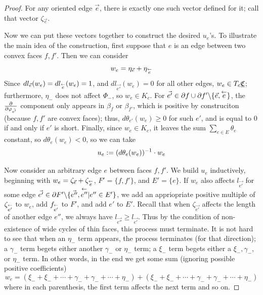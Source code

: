 \begin{proof}
For any oriented edge $\vec{e}$,
there is exactly one such vector defined for it;
call that vector $\zeta_{\vec{e}}$.


Now we can put these vectors together to construct the desired $u_e$'s.
To illustrate the main idea of the construction,
first suppose that $e$ is an edge between two convex faces $f,f'$.
Then we can consider
\[
w_e = \eta_{\vec{e}} + \eta_{\overset{\leftarrow}{e}}
\]
Since $dl_{\vec{e}}(w_e) = dl_{\overset{\leftarrow}{e}}(w_e) = 1$,
and $dl_{\vec{e'}}(w_e) = 0$ for all other edges,
$w_e \in T_c {\underline{\mathfrak{C}}}$;
furthermore, $\eta_-$ does not affect $\Phi_-$,
so $w_e \in K_c$.
For $\vec{e'} \in \partial f \cup \partial f' \backslash \{\vec{e},\overset{\leftarrow}{e}\}$,
the ${\frac{\partial}{\partial \varphi_{\vec{e'}}}}$ component only appears in $\beta_f$
or $\beta_{f'}$, which is positive by construciton
(because $f,f'$ are convex faces);
thus, $d\theta_{e'}(w_e) \geq 0$ for such $e'$, and
is equal to 0 if and only if $e'$ is short.
Finally, since $w_e \in K_c$, it leaves the sum $\sum_{e\in E} \theta_e$
constant, so $d\theta_e(w_e) < 0$, so we can take
\begin{equation}
\label{e:u_e}
u_e := (d\theta_e(w_e))^{-1} \cdot w_e
\end{equation}


Now consider an arbitrary edge $e$ between faces $f,f'$.
We build $u_e$ inductively, beginning with
$w_e = \zeta_{\vec{e}} + \zeta_{\overset{\leftarrow}{e}}$,
$F' = \{f, f'\}$, and $E' = \{e\}$.
If $w_e$ also affects $l_{\vec{e'}}$ for some edge
$\vec{e'} \in \partial F' \backslash\{\vec{e''},\overset{\leftarrow}{e''} | e''\in E'\}$,
we add an appriopriate positive multiple
of $\zeta_{\overset{\leftarrow}{e'}}$ to $w_e$,
add $f_{\overset{\leftarrow}{e'}}$ to $F'$,
and add $e'$ to $E'$.
Recall that when $\zeta_{\vec{e'}}$ affects
the length of another edge $e''$,
we always have $l_{\vec{e''}} \geq l_{\vec{e'}}$.
Thus by the condition of non-existence of wide cycles of thin faces,
this process must terminate.
It is not hard to see that when an $\eta_-$ term appears,
the process terminates (for that direction);
a $\gamma_-$ term begets either another $\gamma_-$ or $\eta_-$ term;
a $\xi_-$ term begets either
a $\xi_-, \gamma_-$, or $\eta_-$ term.
In other words, in the end we get some sum
(ignoring possible positive coefficients)
\[
w_e = (\xi_- + \xi_- + \cdots + \gamma_- + \gamma_- + \cdots + \eta_-)
+ (\xi_- + \xi_- + \cdots + \gamma_- + \gamma_- + \cdots + \eta_-)
\]
where in each parenthesis,
the first term affects the next term and so on.



\end{proof}
